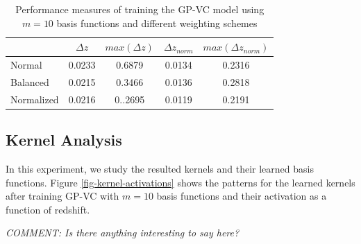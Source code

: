 \documentclass[useAMS,usenatbib,fleqn]{mn2e}
\begin{document}
 \begin{table}
\caption{Performance measures of training the GP-VC model using $m=10$ basis functions and different weighting schemes}
\begin{center}
  \begin{tabular}{| l | c | c | c | c |}
     				&	$\Delta z$	&	$max(\Delta z)$		&	$\Delta z_{norm}$		&	$max(\Delta z_{norm})$	\\	\hline
	Normal		&	0.0233		&	0.6879				&	0.0134				&	0.2316					\\	 
	Balanced	&	0.0215		&	0.3466				&	0.0136				&	0.2818					\\ 
	Normalized	&	0.0216		&	0..2695				&	0.0119				&	0.2191					\\	\hline
  \end{tabular}
  \label{table-normal-balanced}
\end{center}
\end{table}

\subsection{Kernel Analysis}
In this experiment, we study the resulted kernels and their learned basis functions. Figure \ref{fig-kernel-activations} shows the patterns for the learned kernels after training GP-VC with $m=10$ basis functions and their activation as a function of redshift. 

\textit{COMMENT: Is there anything interesting to say here?}
\end{document}
